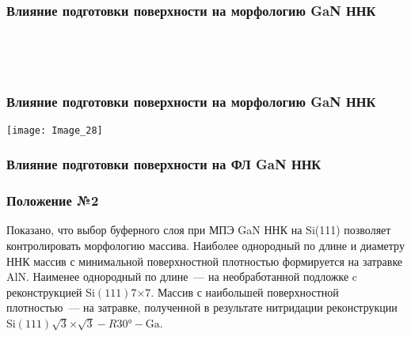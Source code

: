 \begin{frame}
	\frametitle{Влияние подготовки поверхности на морфологию GaN ННК}
	\centering
	\begin{minipage}[t]{0.31\linewidth}
	\end{minipage}
	\\
	\bigskip
	\begin{minipage}[t]{0.31\linewidth}
	\end{minipage}
	\begin{minipage}[t]{0.31\linewidth}
	\end{minipage}
	\begin{minipage}[t]{0.31\linewidth}
	\end{minipage}
	\\
	\bigskip
	\begin{minipage}[t]{0.31\linewidth}
	\end{minipage}
	\begin{minipage}[t]{0.31\linewidth}
	\end{minipage}
	\begin{minipage}[t]{0.31\linewidth}
	\end{minipage}
\end{frame}

\begin{frame}
	\frametitle{Влияние подготовки поверхности на морфологию GaN ННК}
	\centering
	\texttt{[image: Image\_28]}
\end{frame}

\begin{frame}
	\frametitle{Влияние подготовки поверхности на ФЛ GaN ННК}
	\centering
	\begin{minipage}[t]{0.47\linewidth}
	\end{minipage}
	\begin{minipage}[t]{0.47\linewidth}
	\end{minipage}
\end{frame}

\begin{frame}
	\frametitle{Положение №2}
	\Huge
	Показано, что выбор буферного слоя при МПЭ GaN ННК на Si(111) позволяет
	контролировать морфологию массива. Наиболее однородный по длине и диаметру
	ННК массив с минимальной поверхностной плотностью формируется на затравке
	AlN. Наименее однородный по длине~--- на необработанной подложке c
	реконструкцией Si\((111)7\)\(\times\)\(7\). Массив с наибольшей
	поверхностной плотностью~--- на затравке, полученной в результате нитридации
	реконструкции Si\((111)\sqrt{3}\)\(\times\)\(\sqrt{3} - R30\si{\degree} -
	\text{Ga}\).
\end{frame}

